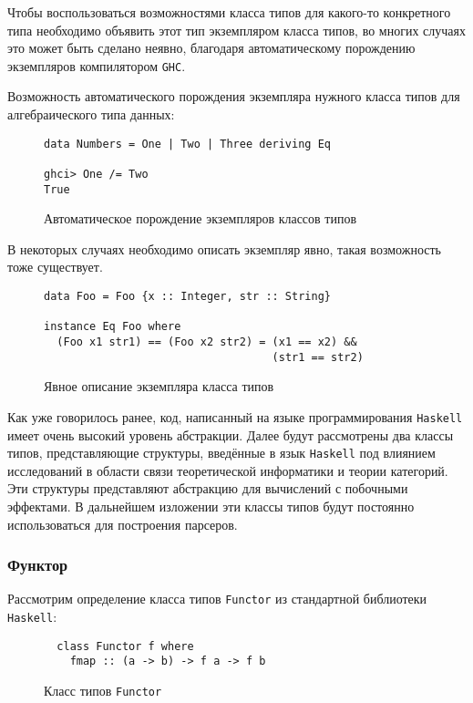 Чтобы воспользоваться возможностями класса типов для какого-то конкретного типа необходимо объявить этот тип экземпляром класса типов, во многих случаях это может быть сделано неявно, благодаря автоматическому порождению экземпляров компилятором \lstinline{GHC}.

Возможность автоматического порождения экземпляра нужного класса типов для алгебраического типа данных:
\begin{figure}[h]
\begin{lstlisting}
data Numbers = One | Two | Three deriving Eq

ghci> One /= Two
True
\end{lstlisting}
\caption{Автоматическое порождение экземпляров классов типов}
\label{listing:List}
\end{figure}


В некоторых случаях необходимо описать экземпляр явно, такая возможность тоже существует.

\begin{figure}[h]
\begin{lstlisting}
data Foo = Foo {x :: Integer, str :: String}

instance Eq Foo where
  (Foo x1 str1) == (Foo x2 str2) = (x1 == x2) &&
                                   (str1 == str2)
\end{lstlisting}
\caption{Явное описание экземпляра класса типов}
\label{listing:Instance}
\end{figure}

Как уже говорилось ранее, код, написанный на языке программирования \lstinline{Haskell} имеет очень высокий уровень абстракции. Далее будут рассмотрены два классы типов, представляющие структуры, введённые в язык \lstinline{Haskell} под влиянием исследований в области связи теоретической информатики и теории категорий. Эти структуры представляют абстракцию для вычислений с побочными эффектами. В дальнейшем изложении эти классы типов будут постоянно использоваться для построения парсеров.

\subsubsection{Функтор}

Рассмотрим определение класса типов \lstinline{Functor} из стандартной библиотеки \lstinline{Haskell}:

\begin{figure}[h]
\begin{lstlisting}
  class Functor f where
    fmap :: (a -> b) -> f a -> f b
\end{lstlisting}
\caption{Класс типов \lstinline{Functor}}
\label{listing:Functor}
\end{figure}

